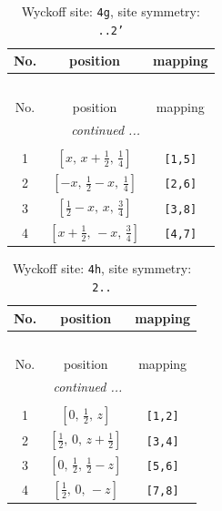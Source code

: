 \documentclass[fleqn,8pt]{jsarticle}
\begin{document}
\renewcommand{\arraystretch}{1.2}
\begin{longtable}{ccc}
\caption{Wyckoff site: {\tt 4g}, site symmetry: {\tt ..2'}}
 \\
 \hline \hline
No. & position & mapping \\ \hline \endfirsthead

\multicolumn{2}{l}{\tablename\ \thetable{}} \\
 \hline \hline
No. & position & mapping \\ \hline \endhead

 \hline \hline
\multicolumn{2}{r}{\footnotesize\it continued ...} \\ \endfoot

 \hline \hline
\multicolumn{2}{r}{} \\ \endlastfoot

1 & $\left[ x,\, x + \frac{1}{2},\, \frac{1}{4} \right]$ & {\tt [1,5]} \\ \hline
2 & $\left[ - x,\, \frac{1}{2} - x,\, \frac{1}{4} \right]$ & {\tt [2,6]} \\ \hline
3 & $\left[ \frac{1}{2} - x,\, x,\, \frac{3}{4} \right]$ & {\tt [3,8]} \\ \hline
4 & $\left[ x + \frac{1}{2},\, - x,\, \frac{3}{4} \right]$ & {\tt [4,7]} \\
\end{longtable}
\renewcommand{\arraystretch}{1.2}
\begin{longtable}{ccc}
\caption{Wyckoff site: {\tt 4h}, site symmetry: {\tt 2..}}
 \\
 \hline \hline
No. & position & mapping \\ \hline \endfirsthead

\multicolumn{2}{l}{\tablename\ \thetable{}} \\
 \hline \hline
No. & position & mapping \\ \hline \endhead

 \hline \hline
\multicolumn{2}{r}{\footnotesize\it continued ...} \\ \endfoot

 \hline \hline
\multicolumn{2}{r}{} \\ \endlastfoot

1 & $\left[ 0,\, \frac{1}{2},\, z \right]$ & {\tt [1,2]} \\ \hline
2 & $\left[ \frac{1}{2},\, 0,\, z + \frac{1}{2} \right]$ & {\tt [3,4]} \\ \hline
3 & $\left[ 0,\, \frac{1}{2},\, \frac{1}{2} - z \right]$ & {\tt [5,6]} \\ \hline
4 & $\left[ \frac{1}{2},\, 0,\, - z \right]$ & {\tt [7,8]} \\
\end{longtable}
\end{document}
